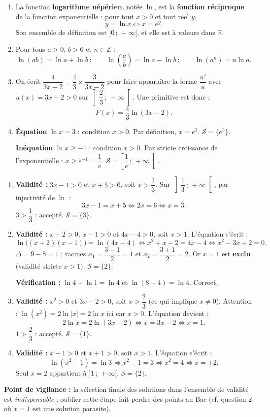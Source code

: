\documentclass[11pt]{article}
\begin{document}
\begin{corrige}
\begin{enumerate}
\item La fonction \textbf{logarithme népérien}, notée $\ln$, est la \textbf{fonction réciproque} de la fonction exponentielle : pour tout $x>0$ et tout réel $y$,
\[ y=\ln x \iff x=e^y. \]
Son ensemble de définition est $]0\,;\,+\infty[$, et elle est à valeurs dans $\mathbb{R}$.
\item Pour tous $a>0$, $b>0$ et $n\in\mathbb{Z}$ :
\[ \ln(ab)=\ln a+\ln b \ ; \qquad \ln\left(\frac{a}{b}\right)=\ln a-\ln b \ ; \qquad \ln(a^n)=n\ln a. \]
\item On écrit $\dfrac{4}{3x-2}=\dfrac{4}{3}\times\dfrac{3}{3x-2}$ pour faire apparaître la forme $\dfrac{u'}{u}$ avec $u(x)=3x-2>0$ sur $\left]\dfrac{2}{3}\,;\,+\infty\right[$. Une primitive est donc :
\[ F(x)=\dfrac{4}{3}\ln(3x-2). \]
\item \textbf{Équation} $\ln x=3$ : condition $x>0$. Par définition, $x=e^3$. $\mathcal{S}=\{e^3\}$.

\textbf{Inéquation} $\ln x\geq -1$ : condition $x>0$. Par stricte croissance de l'exponentielle : $x\geq e^{-1}=\dfrac{1}{e}$. $\mathcal{S}=\left[\dfrac{1}{e}\,;\,+\infty\right[$.
\end{enumerate}
\end{corrige}

\begin{corrige}
\begin{enumerate}
\item \textbf{Validité :} $3x-1>0$ et $x+5>0$, soit $x>\dfrac{1}{3}$. Sur $\left]\dfrac{1}{3}\,;\,+\infty\right[$, par injectivité de $\ln$ :
\[ 3x-1=x+5 \iff 2x=6 \iff x=3. \]
$3>\dfrac{1}{3}$ : accepté. $\mathcal{S}=\{3\}$.
\item \textbf{Validité :} $x+2>0$, $x-1>0$ et $4x-4>0$, soit $x>1$. L'équation s'écrit :
\[ \ln\bigl((x+2)(x-1)\bigr)=\ln(4x-4) \iff x^2+x-2=4x-4 \iff x^2-3x+2=0. \]
$\Delta=9-8=1$ ; racines $x_1=\dfrac{3-1}{2}=1$ et $x_2=\dfrac{3+1}{2}=2$. Or $x=1$ est \textbf{exclu} (validité stricte $x>1$). $\mathcal{S}=\{2\}$.

\textbf{Vérification :} $\ln 4+\ln 1=\ln 4$ et $\ln(8-4)=\ln 4$. Correct.
\item \textbf{Validité :} $x^2>0$ et $3x-2>0$, soit $x>\dfrac{2}{3}$ (ce qui implique $x\neq 0$). Attention : $\ln(x^2)=2\ln|x|=2\ln x$ ici car $x>0$. L'équation devient :
\[ 2\ln x=2\ln(3x-2) \iff x=3x-2 \iff x=1. \]
$1>\dfrac{2}{3}$ : accepté. $\mathcal{S}=\{1\}$.
\item \textbf{Validité :} $x-1>0$ et $x+1>0$, soit $x>1$. L'équation s'écrit :
\[ \ln(x^2-1)=\ln 3 \iff x^2-1=3 \iff x^2=4 \iff x=\pm 2. \]
Seul $x=2$ appartient à $]1\,;\,+\infty[$. $\mathcal{S}=\{2\}$.
\end{enumerate}
\textbf{Point de vigilance :} la sélection finale des solutions dans l'ensemble de validité est \emph{indispensable} ; oublier cette étape fait perdre des points au Bac (cf. question 2 où $x=1$ est une solution parasite).
\end{corrige}
\end{document}
